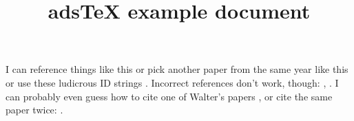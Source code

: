 \documentclass[10pt,a4paper]{article}
\begin{document}
\title{adsTeX example document}
\maketitle
I can reference things like this \cite{THands2014MNRAS} or pick another paper from the same year like this \cite{THands2014IAUS} or use these ludicrous ID strings \citep{2014MNRAS.445.2285D}. Incorrect references don't work, though: \cite{MBlobbyNEdmonds1990}, \cite{3123MNRAS.123.123D}. I can probably even guess how to cite one of Walter's papers \citep{WDehnen2000MNRAS}, or cite the same paper twice: \cite{THands2014MNRAS}.


\end{document}
